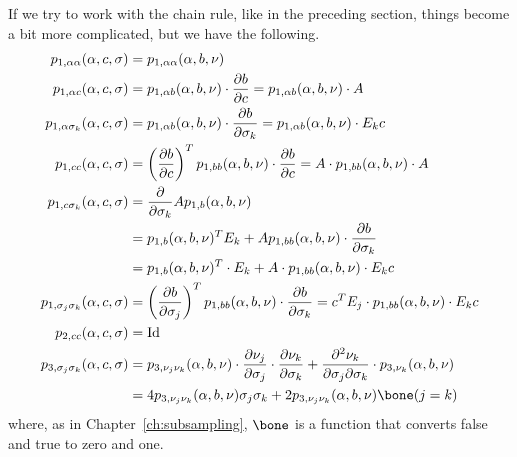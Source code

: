 If we try to work with the chain rule, like in the preceding section,
things become a bit more complicated, but we have the following.
\begin{align*}
   p_{1, \alpha \alpha}(\alpha, c, \sigma)
   & =
   p_{1, \alpha \alpha}(\alpha, b, \nu)
   \\
   p_{1, \alpha c}(\alpha, c, \sigma)
   & =
   p_{1, \alpha b}(\alpha, b, \nu) \cdot \frac{\partial b}{\partial c}
   =
   p_{1, \alpha b}(\alpha, b, \nu) \cdot A
   \\
   p_{1, \alpha \sigma_k}(\alpha, c, \sigma)
   & =
   p_{1, \alpha b}(\alpha, b, \nu) \cdot \frac{\partial b}{\partial \sigma_k}
   =
   p_{1, \alpha b}(\alpha, b, \nu) \cdot E_k c
   \\
   p_{1, c c}(\alpha, c, \sigma)
   & =
   \left(\frac{\partial b}{\partial c}\right)^T
   p_{1, b b}(\alpha, b, \nu) \cdot \frac{\partial b}{\partial c}
   =
   A \cdot p_{1, b b}(\alpha, b, \nu) \cdot A
   \\
   p_{1, c \sigma_k}(\alpha, c, \sigma)
   & =
   \frac{\partial}{\partial \sigma_k} A p_{1, b}(\alpha, b, \nu)
   \\
   & =
   p_{1, b}(\alpha, b, \nu)^T E_k
   +
   A p_{1, b b}(\alpha, b, \nu) \cdot \frac{\partial b}{\partial \sigma_k}
   \\
   & =
   p_{1, b}(\alpha, b, \nu)^T \cdot E_k
   +
   A \cdot p_{1, b b}(\alpha, b, \nu) \cdot E_k c
   \\
   p_{1, \sigma_j \sigma_k}(\alpha, c, \sigma)
   & =
   \left(\frac{\partial b}{\partial \sigma_j}\right)^T
   p_{1, b b}(\alpha, b, \nu)
   \cdot \frac{\partial b}{\partial \sigma_k}
   =
   c^T E_j \cdot p_{1, b b}(\alpha, b, \nu) \cdot E_k c
   \\
   p_{2, c c}(\alpha, c, \sigma) & = \text{Id}
   \\
   p_{3, \sigma_j \sigma_k}(\alpha, c, \sigma) & =
   p_{3, \nu_j \nu_k}(\alpha, b, \nu)
   \cdot
   \frac{\partial \nu_j}{\partial \sigma_j}
   \cdot
   \frac{\partial \nu_k}{\partial \sigma_k}
   +
   \frac{\partial^2 \nu_k}{\partial \sigma_j \partial \sigma_k}
   \cdot
   p_{3, \nu_k}(\alpha, b, \nu)
   \\
   & =
   4 p_{3, \nu_j \nu_k}(\alpha, b, \nu) \sigma_j \sigma_k
   +
   2 p_{3, \nu_j \nu_k}(\alpha, b, \nu) \bone(j = k)
\end{align*}
where, as in Chapter~\ref{ch:subsampling}, $\bone$ is a function that converts
false and true to zero and one.


